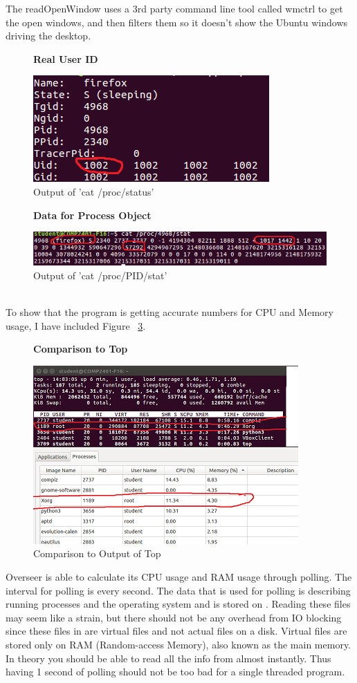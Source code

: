 \documentclass[12pt]{article}
\begin{document}
The readOpenWindow uses a 3rd party command line tool called wmctrl\cite{wmtrl} to get the open windows, and then filters them so it doesn't show the Ubuntu windows driving the desktop.
\begin{figure}[h]
	\centering
	\textbf{Real User ID}\par\medskip
	\includegraphics{realUid}
	\caption{Output of 'cat /proc/status'}
	\label{figRealUid}
\end{figure}
\begin{figure}[h]
	\textbf{Data for Process Object}\par\medskip
	\includegraphics{procPidStat}
	\caption{Output of 'cat /proc/PID/stat'}
	\label{figProcPidStat}
\end{figure}
\\To show that the program is getting accurate numbers for CPU and Memory usage, I have included Figure ~\ref{figCompare}.
\begin{figure}[h]
	\centering
	\textbf{Comparison to Top}\par\medskip
	\includegraphics{compareToTop}
	\caption{Comparison to Output of Top}
	\label{figCompare}
\end{figure}

Overseer is able to calculate its CPU usage and RAM usage through polling.
The interval for polling is every second.
The data that is used for polling is describing running processes and the operating system and is stored on .
Reading these files may seem like a strain, but there should not be any overhead from IO blocking since these files in  are virtual files and not actual files on a disk.
Virtual files are stored only on RAM (Random-access Memory), also known as the main memory.
In theory you should be able to read all the info from  almost instantly.
Thus having 1 second of polling should not be too bad for a single threaded program.
\end{document}
